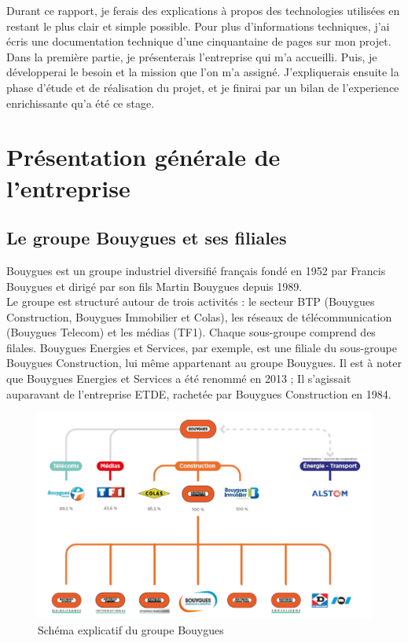 \documentclass[a4paper]{article}
\begin{document}
    Durant ce rapport, je ferais des explications à propos des technologies utilisées en restant le plus clair et simple possible. Pour plus d'informations techniques, j'ai écris une documentation technique d'une cinquantaine de pages sur mon projet. \\

    Dans la première partie, je présenterais l'entreprise qui m'a accueilli. Puis, je développerai le besoin et la mission que l'on m'a assigné. J'expliquerais ensuite la phase d'étude et de réalisation du projet, et je finirai par un bilan de l'experience enrichissante qu'a été ce stage. \\

    \newpage 
    \section{Présentation générale de l'entreprise}

    \subsection{Le groupe Bouygues et ses filiales}

    Bouygues est un groupe industriel diversifié français fondé en 1952 par Francis Bouygues et dirigé par son fils Martin Bouygues depuis 1989. \\

    Le groupe est structuré autour de trois activités : le secteur BTP (Bouygues Construction,
Bouygues Immobilier et Colas), les réseaux de télécommunication (Bouygues Telecom) et les médias (TF1). Chaque sous-groupe comprend des filales. Bouygues Energies et Services, par exemple, est une filiale du sous-groupe Bouygues Construction, lui même appartenant au groupe Bouygues. Il est à noter que Bouygues Energies et Services a été renommé en 2013 ; Il s'agissait auparavant de l'entreprise ETDE, rachetée par Bouygues Construction en 1984. \\

    \begin{figure}[H]
    \includegraphics[scale=0.45]{img/groupeBouygues}
    \caption{Schéma explicatif du groupe Bouygues}
    \end{figure}
\end{document}
